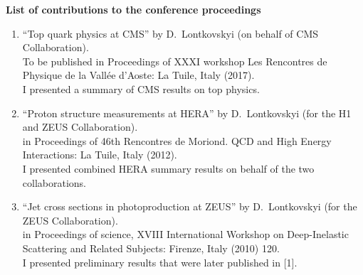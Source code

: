 \begin{flushleft}
\textbf{List of contributions to the conference proceedings}\\
\end{flushleft}
\begin{enumerate}
	\item ``Top quark physics at CMS'' by D.~Lontkovskyi (on behalf of CMS Collaboration).\\
	To be published in Proceedings of XXXI workshop Les Rencontres de Physique de la Vallée d'Aoste: La Tuile, Italy (2017).\\
	I presented a summary of CMS results on top physics.
	\item ``Proton structure measurements at HERA'' by D.~Lontkovskyi (for the H1 and ZEUS Collaboration).\\
	in Proceedings of 46th Rencontres de Moriond. QCD and High Energy Interactions: La Tuile, Italy (2012).\\
	I presented combined HERA summary results on behalf of the two collaborations.
	\item ``Jet cross sections in photoproduction at ZEUS'' by D.~Lontkovskyi (for the ZEUS Collaboration).\\
	in Proceedings of science, XVIII International Workshop on Deep-Inelastic Scattering and Related Subjects: Firenze, Italy (2010) 120.\\
	I presented preliminary results that were later published in [1].
\end{enumerate}
